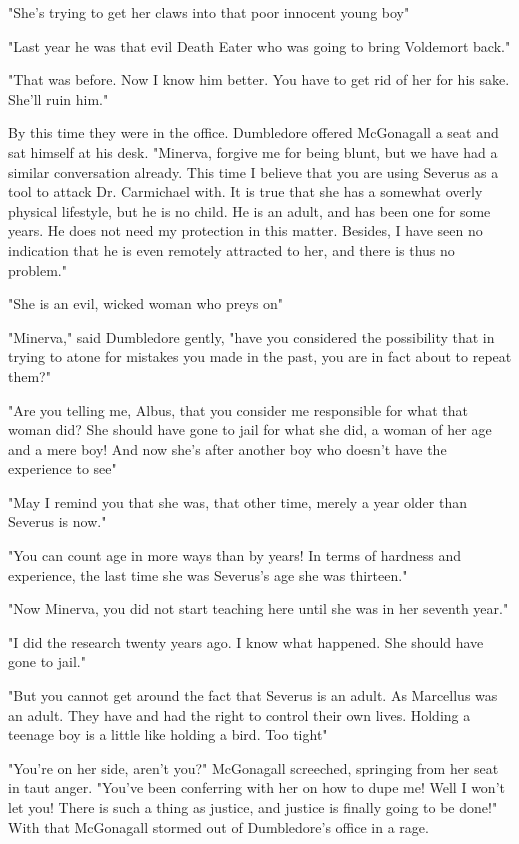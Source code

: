 "She's trying to get her claws into that poor innocent young boy{\el}"

"Last year he was that evil Death Eater who was going to bring Voldemort back."

"That was before. Now I know him better. You have to get rid of her for his sake. She'll ruin him."

By this time they were in the office. Dumbledore offered McGonagall a seat and sat himself at his desk. "Minerva, forgive me for being blunt, but we have had a similar conversation already. This time I believe that you are using Severus as a tool to attack Dr. Carmichael with. It is true that she has a somewhat overly physical lifestyle, but he is no child. He is an adult, and has been one for some years. He does not need my protection in this matter. Besides, I have seen no indication that he is even remotely attracted to her, and there is thus no problem."

"She is an evil, wicked woman who preys on{\el}"

"Minerva," said Dumbledore gently, "have you considered the possibility that in trying to atone for mistakes you made in the past, you are in fact about to repeat them?"

"Are you telling me, Albus, that you consider me responsible for what that woman did? She should have gone to jail for what she did, a woman of her age and a mere boy! And now she's after another boy who doesn't have the experience to see{\el}"

"May I remind you that she was, that other time, merely a year older than Severus is now."

"You can count age in more ways than by years! In terms of hardness and experience, the last time she was Severus's age she was thirteen."

"Now Minerva, you did not start teaching here until she was in her seventh year."

"I did the research twenty years ago. I know what happened. She should have gone to jail."

"But you cannot get around the fact that Severus is an adult. As Marcellus was an adult. They have and had the right to control their own lives. Holding a teenage boy is a little like holding a bird. Too tight{\el}"

"You're on her side, aren't you?" McGonagall screeched, springing from her seat in taut anger. "You've been conferring with her on how to dupe me! Well I won't let you! There is such a thing as justice, and justice is finally going to be done!" With that McGonagall stormed out of Dumbledore's office in a rage.

